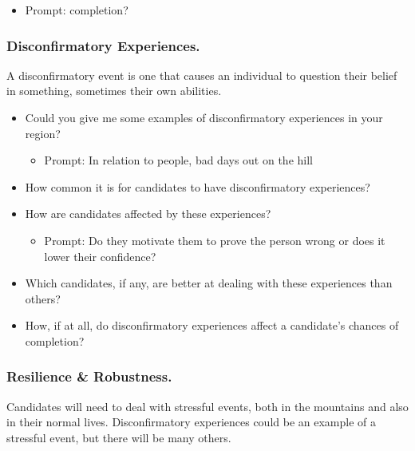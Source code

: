 \documentclass[
  12pt,
  a4paper,
]{book}
\providecommand{\tightlist}{%
  \setlength{\itemsep}{0pt}\setlength{\parskip}{0pt}}
\begin{document}
\begin{itemize}
  \begin{itemize}
  \tightlist
  \item
    Prompt: completion?
  \end{itemize}
\end{itemize}

\hypertarget{disconfirmatory-experiences.}{%
\subsubsection{Disconfirmatory Experiences.}\label{disconfirmatory-experiences.}}

A disconfirmatory event is one that causes an individual to question their belief in something, sometimes their own abilities.

\begin{itemize}
\tightlist
\item
  Could you give me some examples of disconfirmatory experiences in your region?

  \begin{itemize}
  \tightlist
  \item
    Prompt: In relation to people, bad days out on the hill
  \end{itemize}
\item
  How common it is for candidates to have disconfirmatory experiences?
\item
  How are candidates affected by these experiences?

  \begin{itemize}
  \tightlist
  \item
    Prompt: Do they motivate them to prove the person wrong or does it lower their confidence?
  \end{itemize}
\item
  Which candidates, if any, are better at dealing with these experiences than others?
\item
  How, if at all, do disconfirmatory experiences affect a candidate's chances of completion?
\end{itemize}

\hypertarget{resilience-robustness.}{%
\subsubsection{Resilience \& Robustness.}\label{resilience-robustness.}}

Candidates will need to deal with stressful events, both in the mountains and also in their normal lives. Disconfirmatory experiences could be an example of a stressful event, but there will be many others.
\end{document}
